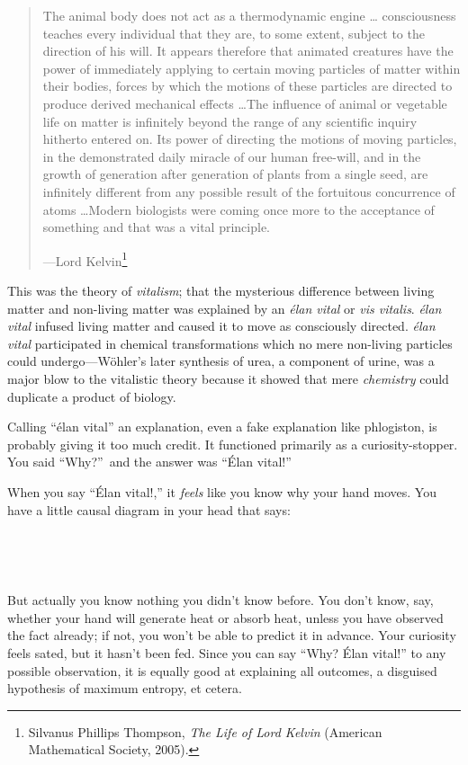 \begin{quote}
{
 The animal body does not act as a thermodynamic engine \ldots
consciousness teaches every individual that they are, to some extent,
subject to the direction of his will. It appears therefore that
animated creatures have the power of immediately applying to certain
moving particles of matter within their bodies, forces by which the
motions of these particles are directed to produce derived mechanical
effects \ldots The influence of animal or vegetable life on matter is
infinitely beyond the range of any scientific inquiry hitherto entered
on. Its power of directing the motions of moving particles, in the
demonstrated daily miracle of our human free-will, and in the growth of
generation after generation of plants from a single seed, are
infinitely different from any possible result of the fortuitous
concurrence of atoms \ldots Modern biologists were coming once more to
the acceptance of something and that was a vital principle.}

{\raggedleft
 {}---Lord Kelvin\footnote{Silvanus Phillips Thompson, \textit{The Life of Lord Kelvin}
(American Mathematical Society, 2005).}
\par}
\end{quote}


{
 This was the theory of \textit{vitalism}; that the mysterious
difference between living matter and non-living matter was explained by
an \textit{élan vital} or \textit{vis vitalis}. \textit{élan vital}
infused living matter and caused it to move as consciously directed.
\textit{élan vital} participated in chemical transformations which no
mere non-living particles could undergo---Wöhler's
later synthesis of urea, a component of urine, was a major blow to the
vitalistic theory because it showed that mere \textit{chemistry} could
duplicate a product of biology.}

{
 Calling ``élan vital'' an
explanation, even a fake explanation like phlogiston, is probably
giving it too much credit. It functioned primarily as a
curiosity-stopper. You said ``Why?''~and the answer was ``Élan vital!''}

{
 When you say ``Élan vital!,''
it \textit{feels} like you know why your hand moves. You have a little
causal diagram in your head that says:}

{
 ~}



{
 ~}

{
 But actually you know nothing you didn't know
before. You don't know, say, whether your hand will
generate heat or absorb heat, unless you have observed the fact
already; if not, you won't be able to predict it in
advance. Your curiosity feels sated, but it hasn't been
fed. Since you can say ``Why? Élan
vital!'' to any possible observation, it is equally
good at explaining all outcomes, a disguised hypothesis of maximum
entropy, et cetera.}

